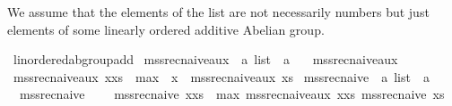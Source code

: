 \begin{isabellebody}
\begin{isamarkuptext}
We assume that the elements of the list are not necessarily numbers but just elements
of some linearly ordered additive Abelian group.%
\end{isamarkuptext}\isamarkuptrue%
\isamarkupfalse%
\ linordered{\isacharunderscore}{\kern0pt}ab{\isacharunderscore}{\kern0pt}group{\isacharunderscore}{\kern0pt}add\isanewline
{}%
\isadelimdocument
%
\endisadelimdocument
%
\isatagdocument
%
\isamarkuptrue%
%
\endisatagdocument
{\isafolddocument}%
%
\isadelimdocument
%
\endisadelimdocument
{}\isamarkupfalse%
\ mss{\isacharunderscore}{\kern0pt}rec{\isacharunderscore}{\kern0pt}naive{\isacharunderscore}{\kern0pt}aux\ {\isacharcolon}{\kern0pt}{\isacharcolon}{\kern0pt}\ {\isachardoublequoteopen}{\isacharprime}{\kern0pt}a\ list\ {\isasymRightarrow}\ {\isacharprime}{\kern0pt}a{\isachardoublequoteclose}\ \isanewline
\ \ {\isachardoublequoteopen}mss{\isacharunderscore}{\kern0pt}rec{\isacharunderscore}{\kern0pt}naive{\isacharunderscore}{\kern0pt}aux\ {\isacharbrackleft}{\kern0pt}{\isacharbrackright}{\kern0pt}\ {\isacharequal}{\kern0pt}\ {}{\isachardoublequoteclose}\isanewline
{\isacharbar}{\kern0pt}\ {\isachardoublequoteopen}mss{\isacharunderscore}{\kern0pt}rec{\isacharunderscore}{\kern0pt}naive{\isacharunderscore}{\kern0pt}aux\ {\isacharparenleft}{\kern0pt}x{\isacharhash}{\kern0pt}xs{\isacharparenright}{\kern0pt}\ {\isacharequal}{\kern0pt}\ max\ {}\ {\isacharparenleft}{\kern0pt}x\ {\isacharplus}{\kern0pt}\ mss{\isacharunderscore}{\kern0pt}rec{\isacharunderscore}{\kern0pt}naive{\isacharunderscore}{\kern0pt}aux\ xs{\isacharparenright}{\kern0pt}{\isachardoublequoteclose}\isanewline
\isanewline
{}\isamarkupfalse%
\ mss{\isacharunderscore}{\kern0pt}rec{\isacharunderscore}{\kern0pt}naive\ {\isacharcolon}{\kern0pt}{\isacharcolon}{\kern0pt}\ {\isachardoublequoteopen}{\isacharprime}{\kern0pt}a\ list\ {\isasymRightarrow}\ {\isacharprime}{\kern0pt}a{\isachardoublequoteclose}\ \isanewline
\ \ {\isachardoublequoteopen}mss{\isacharunderscore}{\kern0pt}rec{\isacharunderscore}{\kern0pt}naive\ {\isacharbrackleft}{\kern0pt}{\isacharbrackright}{\kern0pt}\ {\isacharequal}{\kern0pt}\ {}{\isachardoublequoteclose}\isanewline
{\isacharbar}{\kern0pt}\ {\isachardoublequoteopen}mss{\isacharunderscore}{\kern0pt}rec{\isacharunderscore}{\kern0pt}naive\ {\isacharparenleft}{\kern0pt}x{\isacharhash}{\kern0pt}xs{\isacharparenright}{\kern0pt}\ {\isacharequal}{\kern0pt}\ max\ {\isacharparenleft}{\kern0pt}mss{\isacharunderscore}{\kern0pt}rec{\isacharunderscore}{\kern0pt}naive{\isacharunderscore}{\kern0pt}aux\ {\isacharparenleft}{\kern0pt}x{\isacharhash}{\kern0pt}xs{\isacharparenright}{\kern0pt}{\isacharparenright}{\kern0pt}\ {\isacharparenleft}{\kern0pt}mss{\isacharunderscore}{\kern0pt}rec{\isacharunderscore}{\kern0pt}naive\ xs{\isacharparenright}{\kern0pt}{\isachardoublequoteclose}\isanewline

\end{isabellebody}
